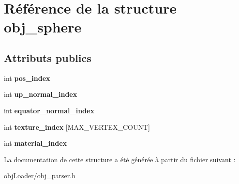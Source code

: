 \hypertarget{structobj__sphere}{\section{Référence de la structure obj\-\_\-sphere}
\label{structobj__sphere}
}
\subsection*{Attributs publics}
\begin{DoxyCompactItemize}
\item 
\hypertarget{structobj__sphere_a15fd097586d7b88ac867b4f0ef5bfa8b}{int {\bfseries pos\-\_\-index}}\label{structobj__sphere_a15fd097586d7b88ac867b4f0ef5bfa8b}

\item 
\hypertarget{structobj__sphere_a1bd3b2af2191462e31f8a2a7d7a9105e}{int {\bfseries up\-\_\-normal\-\_\-index}}\label{structobj__sphere_a1bd3b2af2191462e31f8a2a7d7a9105e}

\item 
\hypertarget{structobj__sphere_aeefc59c5cf2a8182c9065c8be98a1822}{int {\bfseries equator\-\_\-normal\-\_\-index}}\label{structobj__sphere_aeefc59c5cf2a8182c9065c8be98a1822}

\item 
\hypertarget{structobj__sphere_a14cbe08a18e529415cc1166e4f27ff8d}{int {\bfseries texture\-\_\-index} \mbox{[}M\-A\-X\-\_\-\-V\-E\-R\-T\-E\-X\-\_\-\-C\-O\-U\-N\-T\mbox{]}}\label{structobj__sphere_a14cbe08a18e529415cc1166e4f27ff8d}

\item 
\hypertarget{structobj__sphere_a426a609cef880851545e56ffd220ed35}{int {\bfseries material\-\_\-index}}\label{structobj__sphere_a426a609cef880851545e56ffd220ed35}

\end{DoxyCompactItemize}


La documentation de cette structure a été générée à partir du fichier suivant \-:\begin{DoxyCompactItemize}
\item 
obj\-Loader/obj\-\_\-parser.\-h\end{DoxyCompactItemize}
